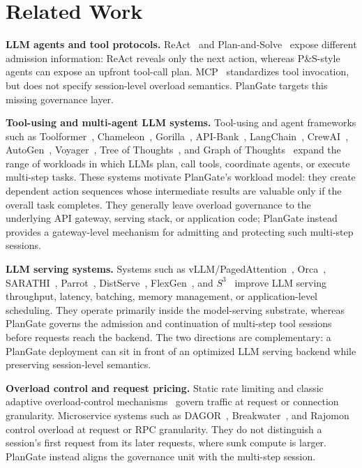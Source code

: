 \documentclass[sigconf,review,anonymous]{acmart}
\begin{document}
\section{Related Work}

\textbf{LLM agents and tool protocols.} ReAct~\cite{react} and Plan-and-Solve~\cite{planandsolve} expose different admission information: ReAct reveals only the next action, whereas P\&S-style agents can expose an upfront tool-call plan. MCP~\cite{mcp2024} standardizes tool invocation, but does not specify session-level overload semantics. PlanGate targets this missing governance layer.

\textbf{Tool-using and multi-agent LLM systems.} Tool-using and agent frameworks such as Toolformer~\cite{toolformer}, Chameleon~\cite{chameleon}, Gorilla~\cite{gorilla}, API-Bank~\cite{apibank}, LangChain~\cite{langchain}, CrewAI~\cite{crewai}, AutoGen~\cite{autogen}, Voyager~\cite{voyager}, Tree of Thoughts~\cite{tot}, and Graph of Thoughts~\cite{got} expand the range of workloads in which LLMs plan, call tools, coordinate agents, or execute multi-step tasks. These systems motivate PlanGate's workload model: they create dependent action sequences whose intermediate results are valuable only if the overall task completes. They generally leave overload governance to the underlying API gateway, serving stack, or application code; PlanGate instead provides a gateway-level mechanism for admitting and protecting such multi-step sessions.

\textbf{LLM serving systems.} Systems such as vLLM/PagedAttention~\cite{vllm}, Orca~\cite{orca}, SARATHI~\cite{sarathi}, Parrot~\cite{parrot}, DistServe~\cite{distserve}, FlexGen~\cite{flexgen}, and $S^3$~\cite{s3} improve LLM serving throughput, latency, batching, memory management, or application-level scheduling. They operate primarily inside the model-serving substrate, whereas PlanGate governs the admission and continuation of multi-step tool sessions before requests reach the backend. The two directions are complementary: a PlanGate deployment can sit in front of an optimized LLM serving backend while preserving session-level semantics.

\textbf{Overload control and request pricing.} Static rate limiting and classic adaptive overload-control mechanisms~\cite{leaky_bucket,overload_survey} govern traffic at request or connection granularity. Microservice systems such as DAGOR~\cite{dagor}, Breakwater~\cite{breakwater}, and Rajomon~\cite{rajomon2025} control overload at request or RPC granularity. They do not distinguish a session's first request from its later requests, where sunk compute is larger. PlanGate instead aligns the governance unit with the multi-step session.
\end{document}
